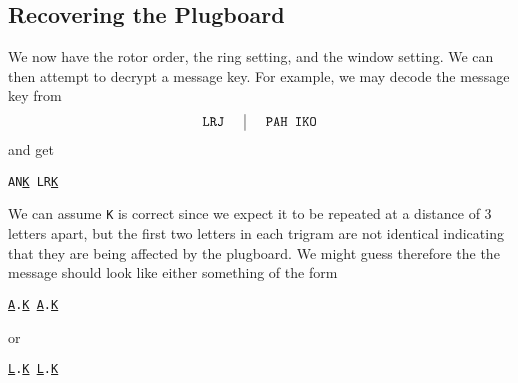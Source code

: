 \subsection{Recovering the Plugboard}
We now have the rotor order, the ring setting, and the window
setting. We can then attempt to decrypt a message key. For example,
we may decode the message key from
\[
  \setlength{\arraycolsep}{15pt}
  \begin{array}{c | c}
    \texttt{LRJ} & \texttt{PAH }\texttt{IKO} \\
  \end{array}
\]
and get
\begin{center}
  \texttt{AN}{\uline{\texttt{K}}}\texttt{ LR}{\uline{\texttt{K}}}
\end{center}
We can assume \texttt{K} is correct since we expect it to be repeated
at a distance of 3 letters apart, but the first two letters in each
trigram are not identical indicating that they are being affected by
the plugboard. We might guess therefore the the message should look
like either something of the form
\begin{center}
  {\uline{\texttt{A}}}\texttt{.}{\uline{\texttt{K}}}\texttt{
  }{\uline{\texttt{A}}}\texttt{.}{\uline{\texttt{K}}}
\end{center}
or
\begin{center}
  {\uline{\texttt{L}}}\texttt{.}{\uline{\texttt{K}}}\texttt{
  }{\uline{\texttt{L}}}\texttt{.}{\uline{\texttt{K}}}
\end{center}

